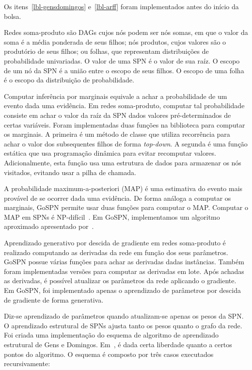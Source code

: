 \documentclass[12pt]{article}
\theoremstyle{plain}
\numberwithin{equation}{section}
\begin{document}
Os itens~\ref{lbl-gensdomingos} e~\ref{lbl-arff} foram implementados antes do início da bolsa.

Redes soma-produto são DAGs cujos nós podem ser nós somas, em que o valor da soma é a média
ponderada de seus filhos; nós produtos, cujos valores são o produtório de seus filhos; ou folhas,
que representam distribuições de probabilidade univariadas. O valor de uma SPN é o valor de sua
raíz. O escopo de um nó da SPN é a união entre o escopo de seus filhos. O escopo de uma folha é o
escopo da distribuição de probabilidade.

Computar inferência por marginais equivale a achar a probabilidade de um evento dada uma evidência.
Em redes soma-produto, computar tal probabilidade consiste em achar o valor da raíz da SPN dados
valores pré-determinados de certas variáveis. Foram implementadas duas funções na biblioteca para
computar os marginais. A primeira é um método de classe que utiliza recorrência para achar o valor
dos subsequentes filhos de forma \textit{top-down}. A segunda é uma função estática que usa
programação dinâmica para evitar recomputar valores. Adicionalmente, esta função usa uma estrutura
de dados para armazenar os nós visitados, evitando usar a pilha de chamada.

A probabilidade maximum-a-posteriori (MAP) é uma estimativa do evento mais provável de se ocorrer
dada uma evidência. De forma análoga a computar os marginais, GoSPN permite usar duas funções para
computar o MAP\@. Computar o MAP em SPNs é NP-difícil~\cite{peharz-spn,cmc2017}. Em GoSPN,
implementamos um algoritmo aproximado apresentado por~\cite{poon-domingos}.

Aprendizado generativo por descida de gradiente em redes soma-produto é realizado computando as
derivadas da rede em função dos seus parâmetros. GoSPN possue várias funções para achar as
derivadas dadas instâncias. Também foram implementadas versões para computar as derivadas em lote.
Após achadas as derivadas, é possível atualizar os parâmetros da rede aplicando o gradiente. Em
GoSPN, foi implementado apenas o aprendizado de parâmetros por descida de gradiente de forma
generativa.

Diz-se aprendizado de parâmetros quando atualizam-se apenas os pesos da SPN\@. O aprendizado
estrutural de SPNs ajusta tanto os pesos quanto o grafo da rede. Foi criada uma implementação do
esquema de algoritmo de aprendizado estrutural de Gens e Domingos. Em~\cite{gens-domingos}, é dada
certa liberdade quanto a certos pontos do algoritmo. O esquema é composto por três casos executados
recursivamente:
\end{document}
